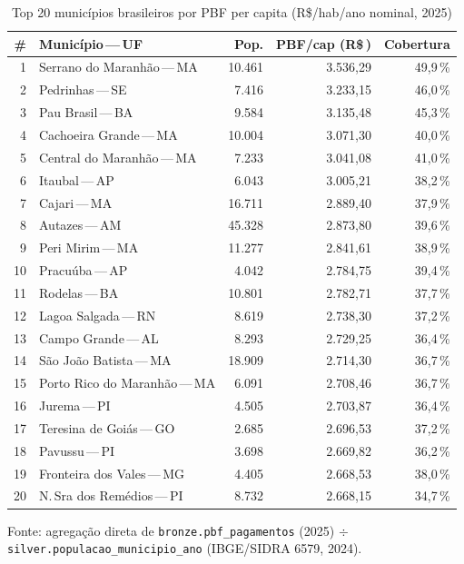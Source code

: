 \documentclass[12pt,a4paper,oneside]{article}
\newcommand{\rs}{R\$\,}
\begin{document}
\begin{table}[H]\centering\small
\caption{Top 20 municípios brasileiros por PBF per capita (R\$/hab/ano nominal, 2025)}
\label{tab:top20}
\begin{tabular}{rlrrr}
\toprule
\# & \textbf{Município\,---\,UF} & \textbf{Pop.} & \textbf{PBF/cap (\rs)} & \textbf{Cobertura} \\
\midrule
1 & Serrano do Maranhão\,---\,MA      & 10.461 & 3.536{,}29 & 49{,}9\,\% \\
2 & Pedrinhas\,---\,SE                & 7.416  & 3.233{,}15 & 46{,}0\,\% \\
3 & Pau Brasil\,---\,BA               & 9.584  & 3.135{,}48 & 45{,}3\,\% \\
4 & Cachoeira Grande\,---\,MA         & 10.004 & 3.071{,}30 & 40{,}0\,\% \\
5 & Central do Maranhão\,---\,MA      & 7.233  & 3.041{,}08 & 41{,}0\,\% \\
6 & Itaubal\,---\,AP                  & 6.043  & 3.005{,}21 & 38{,}2\,\% \\
7 & Cajari\,---\,MA                   & 16.711 & 2.889{,}40 & 37{,}9\,\% \\
8 & Autazes\,---\,AM                  & 45.328 & 2.873{,}80 & 39{,}6\,\% \\
9 & Peri Mirim\,---\,MA               & 11.277 & 2.841{,}61 & 38{,}9\,\% \\
10 & Pracuúba\,---\,AP                & 4.042  & 2.784{,}75 & 39{,}4\,\% \\
11 & Rodelas\,---\,BA                 & 10.801 & 2.782{,}71 & 37{,}7\,\% \\
12 & Lagoa Salgada\,---\,RN           & 8.619  & 2.738{,}30 & 37{,}2\,\% \\
13 & Campo Grande\,---\,AL            & 8.293  & 2.729{,}25 & 36{,}4\,\% \\
14 & São João Batista\,---\,MA        & 18.909 & 2.714{,}30 & 36{,}7\,\% \\
15 & Porto Rico do Maranhão\,---\,MA  & 6.091  & 2.708{,}46 & 36{,}7\,\% \\
16 & Jurema\,---\,PI                  & 4.505  & 2.703{,}87 & 36{,}4\,\% \\
17 & Teresina de Goiás\,---\,GO       & 2.685  & 2.696{,}53 & 37{,}2\,\% \\
18 & Pavussu\,---\,PI                 & 3.698  & 2.669{,}82 & 36{,}2\,\% \\
19 & Fronteira dos Vales\,---\,MG     & 4.405  & 2.668{,}53 & 38{,}0\,\% \\
20 & N.\,Sra dos Remédios\,---\,PI    & 8.732  & 2.668{,}15 & 34{,}7\,\% \\
\bottomrule
\end{tabular}
\flushleft\footnotesize Fonte: agregação direta de
\texttt{bronze.pbf\_pagamentos} (2025) $\div$ \texttt{silver.populacao\_municipio\_ano}
(IBGE/SIDRA 6579, 2024).
\end{table}
\end{document}
